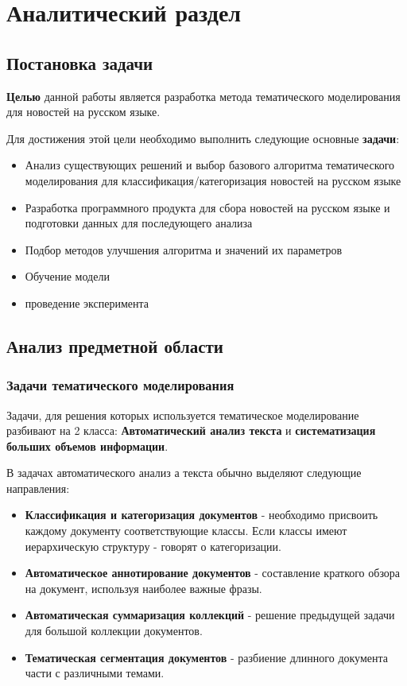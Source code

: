 \chapter{Аналитический раздел}

%
\section{Постановка задачи}
\textbf{Целью} данной работы является разработка метода тематического моделирования для новостей на русском языке.

Для достижения этой цели необходимо выполнить следующие основные \textbf{задачи}:

\begin{itemize}
    \item \todo{}Анализ существующих решений и выбор базового алгоритма тематического моделирования для классификация/категоризация новостей на русском языке
    \item Разработка программного продукта для сбора новостей на русском языке и подготовки данных для последующего анализа
    \item Подбор методов улучшения алгоритма и значений их параметров
    \item Обучение модели
    \item \todo{}проведение эксперимента
\end{itemize}

%
\section{Анализ предметной области}

\subsection{Задачи тематического моделирования}

Задачи, для решения которых используется тематическое моделирование разбивают на 2 класса: \textbf{Автоматический анализ текста} и \textbf{систематизация больших объемов информации}.

В задачах автоматического анализ а текста обычно выделяют следующие направления:

\begin{itemize}
    \item \textbf{Классификация и категоризация документов} - необходимо присвоить каждому документу соответствующие классы. Если классы имеют иерархическую структуру - говорят о категоризации.
    \item \textbf{Автоматическое аннотирование документов} - составление краткого обзора на документ, используя наиболее важные фразы.
    \item \textbf{Автоматическая суммаризация коллекций} - решение предыдущей задачи для большой коллекции документов.
    \item \textbf{Тематическая сегментация документов} - разбиение длинного документа части с различными темами.
\end{itemize}

